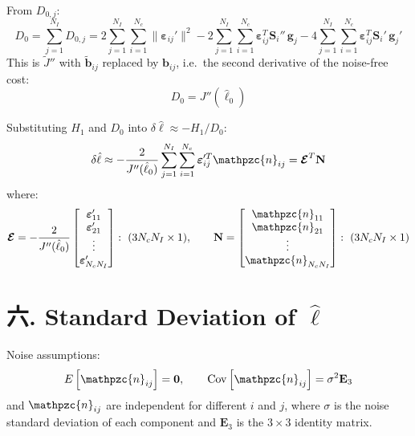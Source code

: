 \documentclass[11pt]{article}
\newcommand{\lh}{\hat{\ell}}
\newcommand{\dl}{\delta\hat{\ell}}
\newcommand{\nn}{\mathpzc{n}}   %
\begin{document}
From $D_{0,j}$:
\[
D_0=\sum_{j=1}^{N_I}D_{0,j}
=2\sum_{j=1}^{N_I}\sum_{i=1}^{N_c}\|\boldsymbol{\varepsilon}_{ij}'\|^{2}
-2\sum_{j=1}^{N_I}\sum_{i=1}^{N_c}\boldsymbol{\varepsilon}_{ij}^{T}\mathbf{S}_i''\,\mathbf{g}_j
-4\sum_{j=1}^{N_I}\sum_{i=1}^{N_c}\boldsymbol{\varepsilon}_{ij}^{T}\mathbf{S}_i'\,\mathbf{g}_j'
\]
This is $\tilde{J}''$ with $\tilde{\mathbf{b}}_{ij}$ replaced by $\mathbf{b}_{ij}$, i.e.\ the second derivative of the noise-free cost:
\[
D_0=J''(\lh_0)
\]

Substituting $H_1$ and $D_0$ into $\dl\approx-H_1/D_0$:
\[
\dl\approx-\frac{2}{J''(\lh_0)}\sum_{j=1}^{N_I}\sum_{i=1}^{N_c}\boldsymbol{\varepsilon}_{ij}'^{T}\nn_{ij}
=\boldsymbol{\mathcal{E}}^{T}\mathbf{N}
\]
where:
\[
\boldsymbol{\mathcal{E}}=-\frac{2}{J''(\lh_0)}
\begin{bmatrix}\boldsymbol{\varepsilon}_{11}'\\ \boldsymbol{\varepsilon}_{21}'\\ \vdots\\ \boldsymbol{\varepsilon}_{N_cN_I}'\end{bmatrix}:\ (3N_cN_I\times1),\qquad
\mathbf{N}=\begin{bmatrix}\nn_{11}\\ \nn_{21}\\ \vdots\\ \nn_{N_cN_I}\end{bmatrix}:\ (3N_cN_I\times1)
\]

\section*{{\cjk 六.} Standard Deviation of $\hat{\ell}$}

Noise assumptions:
\[
E\left[\nn_{ij}\right]=\mathbf{0},\qquad
\operatorname{Cov}\left[\nn_{ij}\right]=\sigma^{2}\mathbf{E}_3
\]
and $\nn_{ij}$ are independent for different $i$ and $j$,
where $\sigma$ is the noise standard deviation of each component and $\mathbf{E}_3$ is the $3\times3$ identity matrix.
\end{document}
